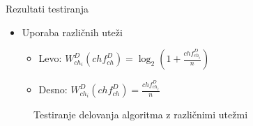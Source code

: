 \documentclass[xcolor=dvipsnames,compress]{beamer}
\begin{document}
\begin{frame}{Rezultati testiranja}
    \begin{itemize}
        \item Uporaba različnih uteži
        \begin{itemize}
            \item Levo: $W_{ch_i}^{D}(ch f_{ch}^D) = \log_2\left(1 + \frac{ch f_{ch_i}^D}{n}\right)$
            \item Desno: $W_{ch_i}^{D}(ch f_{ch}^D) = \frac{ch f_{ch_i}^D}{n}$
        \end{itemize}
    \end{itemize}
    \begin{figure}[ht!]
        \label{fig:subfigures}
        \begin{center}
        \end{center}
       \caption{Testiranje delovanja algoritma z različnimi utežmi}
    \end{figure}
    
\end{frame}
\end{document}
